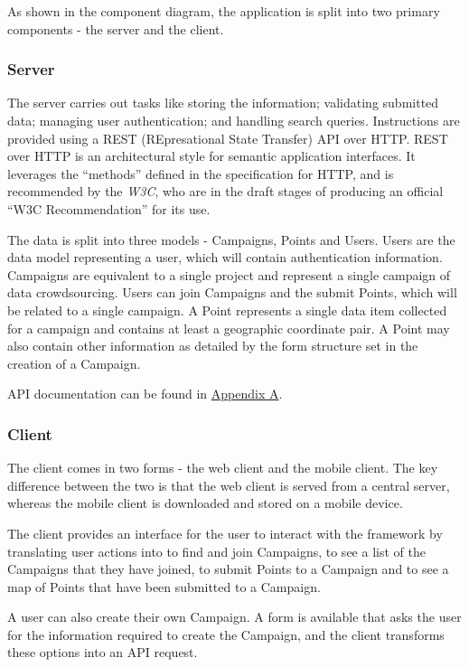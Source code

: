 \documentclass{article}
\begin{document}
		As shown in the component diagram, the application is split into two primary components - the server and the client.

		\subsubsection{Server}

		The server carries out tasks like storing the information; validating submitted data; managing user authentication; and handling search queries. Instructions are provided using a REST (REpresational State Transfer) API over HTTP. REST over HTTP is an architectural style for semantic application interfaces. It leverages the ``methods'' defined in the specification for HTTP, and is recommended by the \emph{W3C}, who are in the draft stages of producing an official ``W3C Recommendation'' for its use\cite{_w3c_2012}.

		The data is split into three models - Campaigns, Points and Users. Users are the data model representing a user, which will contain authentication information. Campaigns are equivalent to a single project and represent a single campaign of data crowdsourcing. Users can join Campaigns and the submit Points, which will be related to a single campaign. A Point represents a single data item collected for a campaign and contains at least a geographic coordinate pair. A Point may also contain other information as detailed by the form structure set in the creation of a Campaign.

		API documentation can be found in \hyperref[sec:api-docs]{Appendix A}.

		\subsubsection{Client}

		The client comes in two forms - the web client and the mobile client. The key difference between the two is that the web client is served from a central server, whereas the mobile client is downloaded and stored on a mobile device.

		The client provides an interface for the user to interact with the framework by translating user actions into to find and join Campaigns, to see a list of the Campaigns that they have joined, to submit Points to a Campaign and to see a map of Points that have been submitted to a Campaign.

		A user can also create their own Campaign. A form is available that asks the user for the information required to create the Campaign, and the client transforms these options into an API request.
\end{document}
